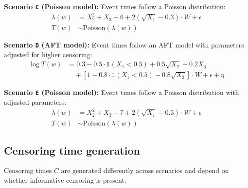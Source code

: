 \documentclass{article} %
\newcommand{\ind}{\mathds{1}}
\begin{document}
\textbf{Scenario \texttt{C} (Poisson model):} Event times follow a Poisson distribution:
\begin{align*}
\lambda(w) &= X_{2}^2 + X_{3} + 6 + 2(\sqrt{X_{1}} - 0.3) \cdot W + \epsilon \\
T(w) &\sim \text{Poisson}(\lambda(w))
\end{align*}

\textbf{Scenario \texttt{D} (AFT model):} Event times follow an AFT model with parameters adjusted for higher censoring:
\begin{align*}
\log T(w) &= 0.3 - 0.5 \cdot \ind(X_{1} < 0.5) + 0.5\sqrt{X_{2}} + 0.2X_{3} \\
&\quad + [1 - 0.8 \cdot \ind(X_{1} < 0.5) - 0.8\sqrt{X_{2}}] \cdot W + \epsilon + \eta
\end{align*}

\textbf{Scenario \texttt{E} (Poisson model):} Event times follow a Poisson distribution with adjusted parameters:
\begin{align*}
\lambda(w) &= X_{2}^2 + X_{3} + 7 + 2(\sqrt{X_{1}} - 0.3) \cdot W + \epsilon \\
T(w) &\sim \text{Poisson}(\lambda(w))
\end{align*}

\subsection{Censoring time generation}
Censoring times $C$ are generated differently across scenarios and depend on whether informative censoring is present:
\end{document}
